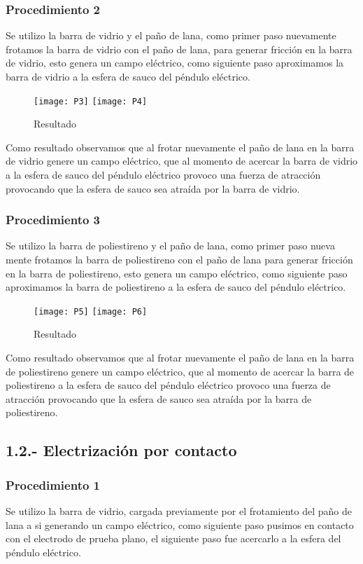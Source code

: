 \documentclass[14pt]{article}
\begin{document}
\subsubsection*{Procedimiento 2}

Se utilizo la barra de vidrio y el paño de lana, como primer paso nuevamente frotamos la barra de vidrio con el paño de lana, para generar fricción en la barra de vidrio, esto genera un campo eléctrico, como siguiente paso aproximamos la barra de vidrio a la esfera de sauco del péndulo eléctrico.

\begin{figure}[h]
\centering
\texttt{[image: P3]}
\texttt{[image: P4]}
\caption{Resultado}
\end{figure}

Como resultado observamos que al frotar nuevamente el paño de lana en la barra de vidrio genere un campo eléctrico, que al momento de acercar la barra de vidrio a la esfera de sauco del péndulo eléctrico provoco una fuerza de atracción provocando que la esfera de sauco sea atraída por la barra de vidrio.
\subsubsection*{Procedimiento 3}
Se utilizo la barra de poliestireno y el paño de lana, como primer paso nueva mente frotamos la barra de poliestireno con el paño de lana para generar fricción en la barra de poliestireno, esto genera un campo eléctrico, como siguiente paso aproximamos la barra de poliestireno a la esfera de sauco del péndulo eléctrico.

\begin{figure}[h]
\centering
\texttt{[image: P5]}
\texttt{[image: P6]}
\caption{Resultado}
\end{figure}

Como resultado observamos que al frotar nuevamente el paño de lana en la barra de poliestireno genere un campo eléctrico, que al momento de acercar la barra de poliestireno a la esfera de sauco del péndulo eléctrico provoco una fuerza de atracción provocando que la esfera de sauco sea atraída por la barra de poliestireno.

\subsection*{1.2.- Electrización por contacto}
\subsubsection*{Procedimiento 1}
Se utilizo la barra de vidrio, cargada previamente por el frotamiento del paño de lana a si generando un campo eléctrico, como siguiente paso pusimos en contacto con el electrodo de prueba plano, el siguiente paso fue acercarlo a la esfera del péndulo eléctrico.
\end{document}
